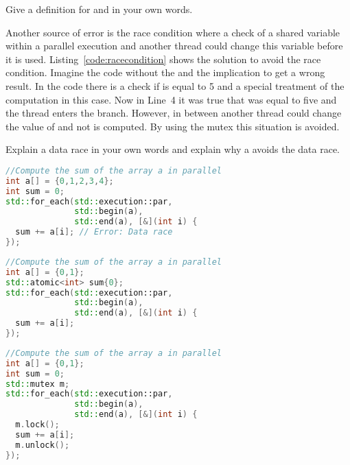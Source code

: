 \begin{exercise}
Give a definition for  and  in your own words. 
\end{exercise}

Another source of error is the race condition where a check of a shared variable within a parallel execution and another thread could change this variable before it is used. Listing~\ref{code:racecondition} shows the solution to avoid the race condition.  Imagine the code without the  and the implication to get a wrong result. In the code there is a check if  is equal to 5 and a special treatment of the computation in this case. Now in Line~4 it was true that  was equal to five and the thread enters the  branch. However, in between another thread could change the value of  and not  is computed. By using the mutex this situation is avoided.

\begin{exercise}
Explain a data race in your own words and explain why a  avoids the data race.
\end{exercise}

\begin{lstlisting}[language=c++,caption={Example code and Solution for a data race.\label{code:data:race}},float,floatplacement=tb]
//Compute the sum of the array a in parallel
int a[] = {0,1,2,3,4};
int sum = 0;
std::for_each(std::execution::par, 
              std::begin(a), 
              std::end(a), [&](int i) {
  sum += a[i]; // Error: Data race
});
\end{lstlisting}


\begin{lstlisting}[language=c++,caption={Solution to avoid the data race using \cpp{std::atomic}.\label{code:datarace:atomic}},float,floatplacement=tb]
//Compute the sum of the array a in parallel
int a[] = {0,1};
std::atomic<int> sum{0};
std::for_each(std::execution::par, 
              std::begin(a), 
              std::end(a), [&](int i) {
  sum += a[i]; 
});
\end{lstlisting}

\begin{lstlisting}[language=c++,caption={Solution to avoid the data race using \cpp{std::mutex}.\label{code:datarace:mutex}},float,floatplacement=tb]
//Compute the sum of the array a in parallel
int a[] = {0,1};
int sum = 0;
std::mutex m;
std::for_each(std::execution::par, 
              std::begin(a), 
              std::end(a), [&](int i) {
  m.lock();
  sum += a[i];
  m.unlock(); 
});
\end{lstlisting}


